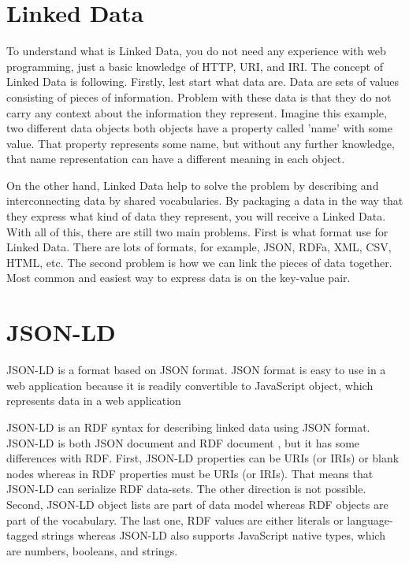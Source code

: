 
\section{Linked Data}

To understand what is Linked Data, you do not need any experience with web programming, just a basic knowledge of HTTP, URI, and IRI. The concept of Linked Data \parencite{Bizare+heath+Berners-Lee,Heath+Bizer} is following. Firstly, lest start what data are. Data are sets of values consisting of pieces of information. Problem with these data is that they do not carry any context about the information they represent. Imagine this example, two different data objects both objects have a property called 'name' with some value. That property represents some name, but without any further knowledge, that name representation can have a different meaning in each object.

On the other hand, Linked Data help to solve the problem by describing and interconnecting data by shared vocabularies. By packaging a data in the way that they express what kind of data they represent,  you will receive a Linked Data. With all of this, there are still two main problems. First is what format use for Linked Data. There are lots of formats, for example, JSON, RDFa, XML, CSV, HTML, etc. The second problem is how we can link the pieces of data together. Most common and easiest way to express data is on the key-value pair. 


\section{JSON-LD}
JSON-LD is a format based on JSON format. JSON format is easy to use in a web application because it is readily convertible to JavaScript object, which represents data in a web application


JSON-LD is an RDF syntax for describing linked data using JSON format. \parencite{JSON-LD} JSON-LD is both JSON document and RDF document \parencite{RDF_doc}, but it has some differences with RDF. First, JSON-LD properties can be URIs (or IRIs) or blank nodes whereas in RDF properties must be URIs (or IRIs). That means that JSON-LD can serialize RDF data-sets. The other direction is not possible. Second, JSON-LD object lists are part of data model whereas RDF objects are part of the vocabulary. The last one, RDF values are either literals or language-tagged strings whereas JSON-LD also supports JavaScript native types, which are numbers, booleans, and strings.

